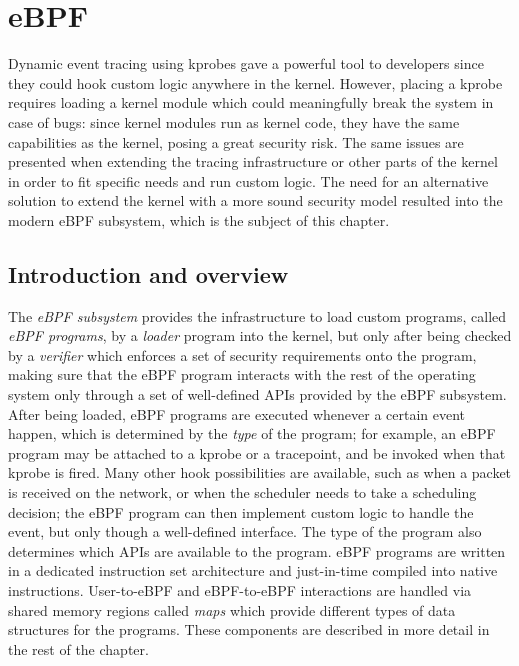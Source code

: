 \chapter{eBPF}

Dynamic event tracing using kprobes gave a powerful tool to developers since
they could hook custom logic anywhere in the kernel. However, placing a kprobe
requires loading a kernel module which could meaningfully break the system in
case of bugs: since kernel modules run as kernel code, they have the same
capabilities as the kernel, posing a great security risk. The same issues are
presented when extending the tracing infrastructure or other parts of the kernel
in order to fit specific needs and run custom logic. The need for an alternative
solution to extend the kernel with a more sound security model resulted into the
modern eBPF subsystem, which is the subject of this chapter.

\section{Introduction and overview}

The \textit{eBPF subsystem} provides the infrastructure to load custom programs,
called \textit{eBPF programs}, by a \textit{loader} program into the kernel, but
only after being checked by a \textit{verifier} which enforces a set of security
requirements onto the program, making sure that the eBPF program interacts with
the rest of the operating system only through a set of well-defined APIs
provided by the eBPF subsystem. After being loaded, eBPF programs are executed
whenever a certain event happen, which is determined by the \textit{type} of the
program; for example, an eBPF program may be attached to a kprobe or a
tracepoint, and be invoked when that kprobe is fired. Many other hook
possibilities are available, such as when a packet is received on the network,
or when the scheduler needs to take a scheduling decision; the eBPF program can
then implement custom logic to handle the event, but only though a well-defined
interface. The type of the program also determines which APIs are available to
the program. eBPF programs are written in a dedicated instruction set
architecture and just-in-time compiled into native instructions. User-to-eBPF
and eBPF-to-eBPF interactions are handled via shared memory regions called
\textit{maps} which provide different types of data structures for the programs.
These components are described in more detail in the rest of the chapter.

